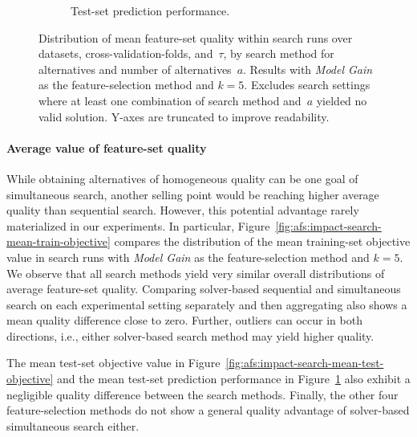 \documentclass{article}
\theoremstyle{definition}
\begin{document}
\begin{figure}[p]
\begin{subfigure}[t]{\textwidth}
		\caption{Test-set prediction performance.}
		\label{fig:afs:impact-search-mean-decision-tree-test-mcc}
	\end{subfigure}
	\caption{
		Distribution of mean feature-set quality within search runs over datasets, cross-validation-folds, and~$\tau$, by search method for alternatives and number of alternatives~$a$.
		Results with \emph{Model Gain} as the feature-selection method and $k=5$.
		Excludes search settings where at least one combination of search method and~$a$ yielded no valid solution.
		Y-axes are truncated to improve readability.
	}
	\label{fig:afs:impact-search-mean-quality}
\end{figure}

\paragraph{Average value of feature-set quality}

While obtaining alternatives of homogeneous quality can be one goal of simultaneous search, another selling point would be reaching higher average quality than sequential search.
However, this potential advantage rarely materialized in our experiments.
In particular, Figure~\ref{fig:afs:impact-search-mean-train-objective} compares the distribution of the mean training-set objective value in search runs with \emph{Model Gain} as the feature-selection method and $k=5$.
We observe that all search methods yield very similar overall distributions of average feature-set quality.
Comparing solver-based sequential and simultaneous search on each experimental setting separately and then aggregating also shows a mean quality difference close to zero.
Further, outliers can occur in both directions, i.e., either solver-based search method may yield higher quality.

The mean test-set objective value in Figure~\ref{fig:afs:impact-search-mean-test-objective} and the mean test-set prediction performance in Figure~\ref{fig:afs:impact-search-mean-decision-tree-test-mcc} also exhibit a negligible quality difference between the search methods.
Finally, the other four feature-selection methods do not show a general quality advantage of solver-based simultaneous search either.
\end{document}

